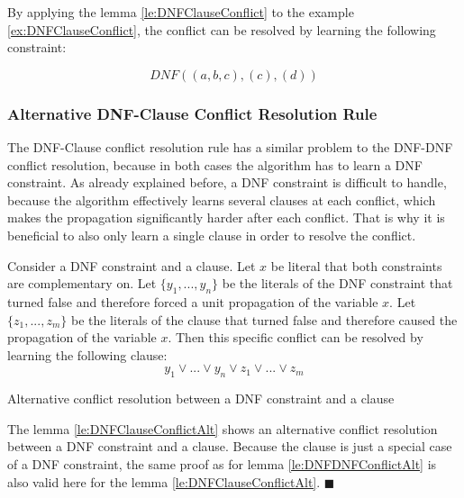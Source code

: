 By applying the lemma \ref{le:DNFClauseConflict} to the example \ref{ex:DNFClauseConflict}, the conflict can be resolved by learning the following constraint:

\begin{leftbar}
\begin{displaymath}
DNF((a,b,c),(c),(d))
\end{displaymath}
\end{leftbar}

\subsubsection{Alternative DNF-Clause Conflict Resolution Rule}

The DNF-Clause conflict resolution rule has a similar problem to the DNF-DNF conflict resolution, because in both cases the algorithm has to learn a DNF constraint. As already explained before, a DNF constraint is difficult to handle, because the algorithm effectively learns several clauses at each conflict, which makes the propagation significantly harder after each conflict. That is why it is beneficial to also only learn a single clause in order to resolve the conflict.

\begin{lemma}
\begin{leftbar}
Consider a DNF constraint and a clause. Let $x$ be literal that both constraints are complementary on. Let $\{y_1,...,y_n\}$ be the literals of the DNF constraint that turned false and therefore forced a unit propagation of the variable $x$. Let $\{z_1,...,z_m\}$ be the literals of the clause that turned false and therefore caused the propagation of the variable $x$. Then this specific conflict can be resolved by learning the following clause:
\begin{displaymath}
y_1 \vee ... \vee y_n \vee z_1 \vee ... \vee z_m
\end{displaymath}
\end{leftbar}
\caption{Alternative conflict resolution between a DNF constraint and a clause}
\label{le:DNFClauseConflictAlt}
\end{lemma}

The lemma \ref{le:DNFClauseConflictAlt} shows an alternative conflict resolution between a DNF constraint and a clause. Because the clause is just a special case of a DNF constraint, the same proof as for lemma \ref{le:DNFDNFConflictAlt} is also valid here for the lemma \ref{le:DNFClauseConflictAlt}. $\blacksquare$



